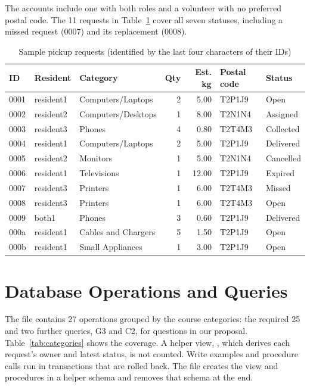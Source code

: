 \documentclass[11pt,letterpaper]{article}
\begin{document}
The accounts include one with both roles and a volunteer with no preferred postal code. The 11 requests in Table~\ref{tab:requests} cover all seven statuses, including a missed request (0007) and its replacement (0008).

\begin{table}[!ht]
\centering\small
\caption{Sample pickup requests (identified by the last four characters of their IDs)}
\label{tab:requests}
\begin{tabular}{@{}lllrrll@{}}
\toprule
ID & Resident & Category & Qty & Est. kg & Postal code & Status \\
\midrule
0001 & resident1 & Computers/Laptops & 2 & 5.00 & T2P1J9 & Open \\
0002 & resident2 & Computers/Desktops & 1 & 8.00 & T2N1N4 & Assigned \\
0003 & resident3 & Phones & 4 & 0.80 & T2T4M3 & Collected \\
0004 & resident1 & Computers/Laptops & 2 & 5.00 & T2P1J9 & Delivered \\
0005 & resident2 & Monitors & 1 & 5.00 & T2N1N4 & Cancelled \\
0006 & resident1 & Televisions & 1 & 12.00 & T2P1J9 & Expired \\
0007 & resident3 & Printers & 1 & 6.00 & T2T4M3 & Missed \\
0008 & resident3 & Printers & 1 & 6.00 & T2T4M3 & Open \\
0009 & both1 & Phones & 3 & 0.60 & T2P1J9 & Delivered \\
000a & resident1 & Cables and Chargers & 5 & 1.50 & T2P1J9 & Open \\
000b & resident1 & Small Appliances & 1 & 3.00 & T2P1J9 & Open \\
\bottomrule
\end{tabular}
\end{table}

\section{Database Operations and Queries}
\label{sec:operations}
The file  contains 27 operations grouped by the course categories: the required 25 and two further queries, G3 and C2, for questions in our proposal. Table~\ref{tab:categories} shows the coverage. A helper view, , which derives each request's owner and latest status, is not counted. Write examples and procedure calls run in transactions that are rolled back. The file creates the view and procedures in a helper schema and removes that schema at the end.
\end{document}

